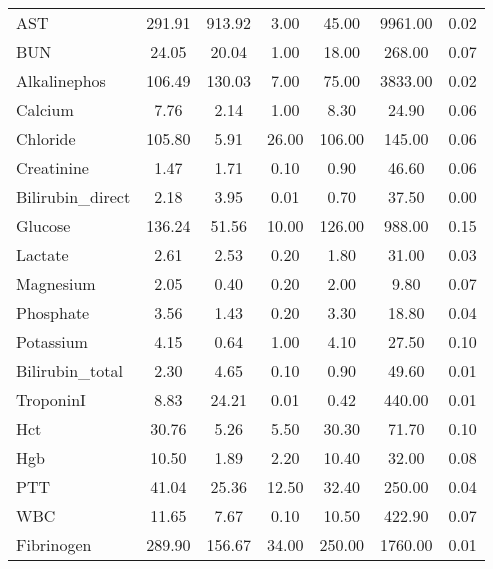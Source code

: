 \begin{longtable}{lcccccc}
AST              & 291.91 &             913.92 &     3.00 &  45.00 & 9961.00 &            0.02 \\
BUN              &  24.05 &              20.04 &     1.00 &  18.00 &  268.00 &            0.07 \\
Alkalinephos     & 106.49 &             130.03 &     7.00 &  75.00 & 3833.00 &            0.02 \\
Calcium          &   7.76 &               2.14 &     1.00 &   8.30 &   24.90 &            0.06 \\
Chloride         & 105.80 &               5.91 &    26.00 & 106.00 &  145.00 &            0.06 \\
Creatinine       &   1.47 &               1.71 &     0.10 &   0.90 &   46.60 &            0.06 \\
Bilirubin\_direct &   2.18 &               3.95 &     0.01 &   0.70 &   37.50 &            0.00 \\
Glucose          & 136.24 &              51.56 &    10.00 & 126.00 &  988.00 &            0.15 \\
Lactate          &   2.61 &               2.53 &     0.20 &   1.80 &   31.00 &            0.03 \\
Magnesium        &   2.05 &               0.40 &     0.20 &   2.00 &    9.80 &            0.07 \\
Phosphate        &   3.56 &               1.43 &     0.20 &   3.30 &   18.80 &            0.04 \\
Potassium        &   4.15 &               0.64 &     1.00 &   4.10 &   27.50 &            0.10 \\
Bilirubin\_total  &   2.30 &               4.65 &     0.10 &   0.90 &   49.60 &            0.01 \\
TroponinI        &   8.83 &              24.21 &     0.01 &   0.42 &  440.00 &            0.01 \\
Hct              &  30.76 &               5.26 &     5.50 &  30.30 &   71.70 &            0.10 \\
Hgb              &  10.50 &               1.89 &     2.20 &  10.40 &   32.00 &            0.08 \\
PTT              &  41.04 &              25.36 &    12.50 &  32.40 &  250.00 &            0.04 \\
WBC              &  11.65 &               7.67 &     0.10 &  10.50 &  422.90 &            0.07 \\
Fibrinogen       & 289.90 &             156.67 &    34.00 & 250.00 & 1760.00 &            0.01 \\

\end{longtable}
